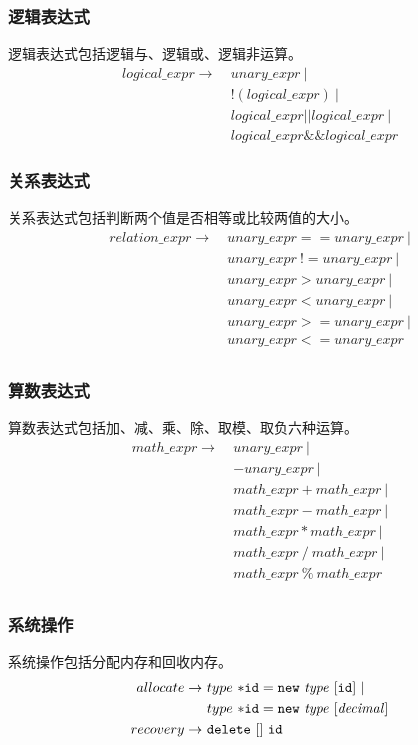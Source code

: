 \documentclass[UTF8,a4paper,10pt]{ctexart}
\begin{document}
\subsubsection{逻辑表达式}
逻辑表达式包括逻辑与、逻辑或、逻辑非运算。
\begin{align*}
logical\_expr \rightarrow\ &unary\_expr\ |\\
&!(logical\_expr)\ |\\
&logical\_expr || logical\_expr\ |\\
&logical\_expr \&\& logical\_expr
\end{align*}
\subsubsection{关系表达式}
关系表达式包括判断两个值是否相等或比较两值的大小。
\begin{align*}
relation\_expr \rightarrow \ &unary\_expr==unary\_expr\ |\\
&unary\_expr\ != unary\_expr\ |\\
&unary\_expr > unary\_expr\ |\\
&unary\_expr < unary\_expr\ |\\
&unary\_expr >= unary\_expr\ |\\
&unary\_expr <= unary\_expr\\
\end{align*}
\subsubsection{算数表达式}
算数表达式包括加、减、乘、除、取模、取负六种运算。
\begin{align*}
math\_expr \rightarrow \ &unary\_expr\ |\\
&-unary\_expr\ |\\
&math\_expr + math\_expr\ |\\
&math\_expr - math\_expr\ |\\
&math\_expr * math\_expr\ |\\
&math\_expr\ / \ math\_expr\ |\\
&math\_expr\ \% \ math\_expr\\
\end{align*}
\subsubsection{系统操作}
系统操作包括分配内存和回收内存。
\begin{align*}
allocate \rightarrow \ &type\ \tt{*id} = \text{$\tt{new} $}\ \it{type}\ [\text{$\tt{id}$}]\ |\\
&type\ \tt{*id} =  \tt{new}\ \it{type}\ [decimal]\\
recovery \rightarrow \ &\tt{delete}\ [] \ id
\end{align*}
\end{document}
